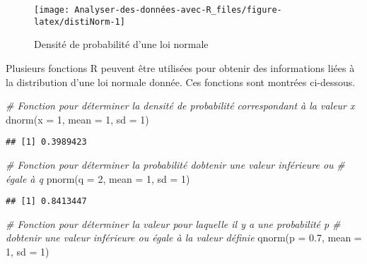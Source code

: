 \documentclass[
]{book}
\newenvironment{Shaded}{\begin{snugshade}}{\end{snugshade}}
\newcommand{\AttributeTok}[1]{\textcolor[rgb]{0.77,0.63,0.00}{#1}}
\newcommand{\CommentTok}[1]{\textcolor[rgb]{0.56,0.35,0.01}{\textit{#1}}}
\newcommand{\DecValTok}[1]{\textcolor[rgb]{0.00,0.00,0.81}{#1}}
\newcommand{\FloatTok}[1]{\textcolor[rgb]{0.00,0.00,0.81}{#1}}
\newcommand{\FunctionTok}[1]{\textcolor[rgb]{0.00,0.00,0.00}{#1}}
\newcommand{\NormalTok}[1]{#1}
\begin{document}
\begin{figure}

{\centering \texttt{[image: Analyser-des-données-avec-R\_files/figure-latex/distiNorm-1]} 

}

\caption{Densité de probabilité d'une loi normale}\label{fig:distiNorm}
\end{figure}

Plusieurs fonctions R peuvent être utilisées pour obtenir des informations liées à la distribution d'une loi normale donnée. Ces fonctions sont montrées ci-dessous.

\begin{Shaded}
\begin{Highlighting}[]
\CommentTok{\# Fonction pour déterminer la densité de probabilité correspondant à la valeur x}
\FunctionTok{dnorm}\NormalTok{(}\AttributeTok{x =} \DecValTok{1}\NormalTok{, }\AttributeTok{mean =} \DecValTok{1}\NormalTok{, }\AttributeTok{sd =} \DecValTok{1}\NormalTok{)}
\end{Highlighting}
\end{Shaded}

\begin{verbatim}
## [1] 0.3989423
\end{verbatim}

\begin{Shaded}
\begin{Highlighting}[]
\CommentTok{\# Fonction pour déterminer la probabilité d\textquotesingle{}obtenir une valeur inférieure ou }
\CommentTok{\# égale à q}
\FunctionTok{pnorm}\NormalTok{(}\AttributeTok{q =} \DecValTok{2}\NormalTok{, }\AttributeTok{mean =} \DecValTok{1}\NormalTok{, }\AttributeTok{sd =} \DecValTok{1}\NormalTok{)}
\end{Highlighting}
\end{Shaded}

\begin{verbatim}
## [1] 0.8413447
\end{verbatim}

\begin{Shaded}
\begin{Highlighting}[]
\CommentTok{\# Fonction pour déterminer la valeur pour laquelle il y a une probabilité p }
\CommentTok{\# d\textquotesingle{}obtenir une valeur inférieure ou égale à la valeur définie}
\FunctionTok{qnorm}\NormalTok{(}\AttributeTok{p =} \FloatTok{0.7}\NormalTok{, }\AttributeTok{mean =} \DecValTok{1}\NormalTok{, }\AttributeTok{sd =} \DecValTok{1}\NormalTok{)}
\end{Highlighting}
\end{Shaded}
\end{document}
